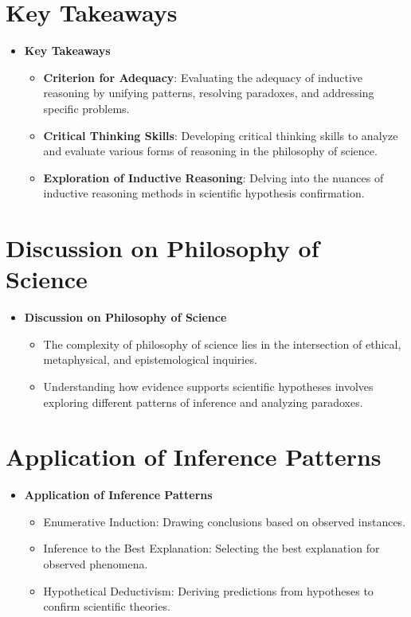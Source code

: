 \documentclass{article}
\begin{document}
\section{Key Takeaways}
\begin{itemize}
  \item \textbf{Key Takeaways}
    \begin{itemize}
      \item \textbf{Criterion for Adequacy}: Evaluating the adequacy of inductive reasoning by unifying patterns, resolving paradoxes, and addressing specific problems.
      \item \textbf{Critical Thinking Skills}: Developing critical thinking skills to analyze and evaluate various forms of reasoning in the philosophy of science.
      \item \textbf{Exploration of Inductive Reasoning}: Delving into the nuances of inductive reasoning methods in scientific hypothesis confirmation.
    \end{itemize}
\end{itemize}

\section{Discussion on Philosophy of Science}
\begin{itemize}
  \item \textbf{Discussion on Philosophy of Science}
    \begin{itemize}
      \item The complexity of philosophy of science lies in the intersection of ethical, metaphysical, and epistemological inquiries.
      \item Understanding how evidence supports scientific hypotheses involves exploring different patterns of inference and analyzing paradoxes.
    \end{itemize}
\end{itemize}

\section{Application of Inference Patterns}
\begin{itemize}
  \item \textbf{Application of Inference Patterns}
    \begin{itemize}
      \item Enumerative Induction: Drawing conclusions based on observed instances.
      \item Inference to the Best Explanation: Selecting the best explanation for observed phenomena.
      \item Hypothetical Deductivism: Deriving predictions from hypotheses to confirm scientific theories.
    \end{itemize}
\end{itemize}
\end{document}
